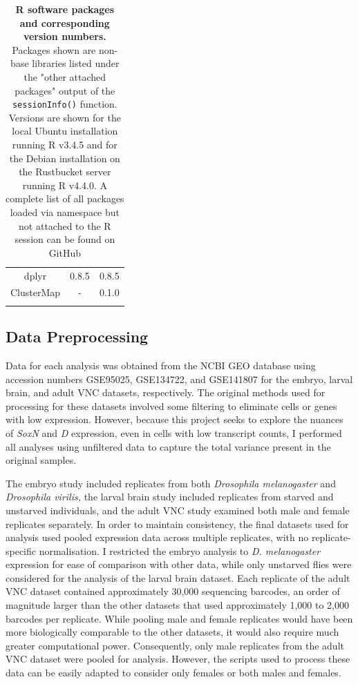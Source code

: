 \documentclass[withindex,glossary]{cam-thesis}
\newcommand{\code}[1]{\mbox{\texttt{#1}}} %
\begin{document}
\begin{table}[htbp]
\begin{adjustbox}{width=.75\textwidth, center=\textwidth}
\begin{tabular}{ccc}
dplyr                     & 0.8.5                   & 0.8.5                       \\
ClusterMap                & -                       & 0.1.0                      \\ \bottomrule{}
\end{tabular}
\end{adjustbox}
\caption{\textbf{R software packages and corresponding version numbers.} Packages shown are non-base libraries listed under the "other attached packages" output of the \code{sessionInfo()} function. Versions are shown for the local Ubuntu installation running R v3.4.5 and for the Debian installation on the Rustbucket server running R v4.4.0. A complete list of all packages loaded via namespace but not attached to the R session can be found on GitHub}
\end{table}

\subsection{Data Preprocessing}

Data for each analysis was obtained from the NCBI GEO database using
accession numbers GSE95025, GSE134722, and GSE141807 for the embryo,
larval brain, and adult VNC datasets, respectively. The original methods
used for processing for these datasets involved some filtering to
eliminate cells or genes with low expression. However, because this
project seeks to explore the nuances of \emph{SoxN} and \emph{D}
expression, even in cells with low transcript counts, I performed all
analyses using unfiltered data to capture the total variance present in
the original samples.

The embryo study included replicates from both \emph{Drosophila
melanogaster} and \emph{Drosophila virilis,} the larval brain study
included replicates from starved and unstarved individuals, and the
adult VNC study examined both male and female replicates separately. In
order to maintain consistency, the final datasets used for analysis used
pooled expression data across multiple replicates, with no
replicate-specific normalisation. I restricted the embryo analysis to
\emph{D. melanogaster} expression for ease of comparison with other
data, while only unstarved flies were considered for the analysis of the
larval brain dataset. Each replicate of the adult VNC dataset contained
approximately 30,000 sequencing barcodes, an order of magnitude larger
than the other datasets that used approximately 1,000 to 2,000 barcodes
per replicate. While pooling male and female replicates would have been
more biologically comparable to the other datasets, it would also
require much greater computational power. Consequently, only male
replicates from the adult VNC dataset were pooled for analysis. However,
the scripts used to process these data can be easily adapted to consider
only females or both males and females.
\end{document}
